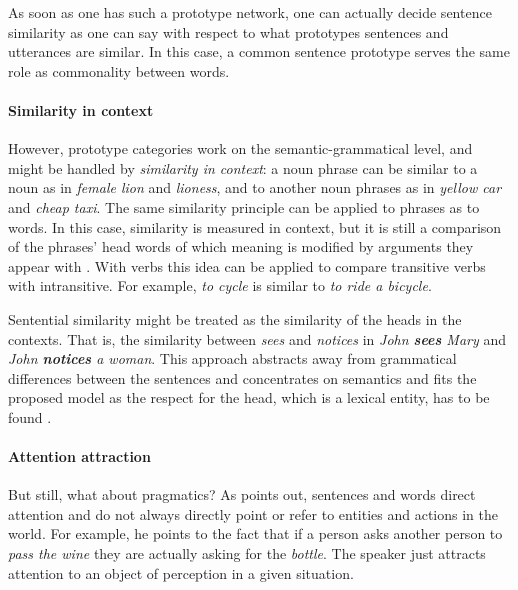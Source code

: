 \documentclass[11pt]{article}
\begin{document}
As soon as one has such a prototype network, one can actually decide sentence similarity as one can say with respect to what prototypes sentences and utterances are similar. In this case, a common sentence prototype serves the same role as commonality between words.

\paragraph{Similarity in context}

However, prototype categories work on the semantic-grammatical level, and might be handled by \emph{similarity in context}: a noun phrase can be similar to a noun as in \textit{female lion} and \textit{lioness}, and to another noun phrases as in \textit{yellow car} and \textit{cheap taxi}. The same similarity principle can be applied to phrases as to words. In this case, similarity is measured in context, but it is still a comparison of the phrases' head words of which meaning is modified by arguments they appear with \cite{Kintsch2001173,mitchell-lapata:2008:ACLMain,mitchell2010composition,Dinu:2010:MDS:1870658.1870771,Baroni2010nouns,thater-furstenau-pinkal:2011:IJCNLP-2011,Seaghdha:2011:PMS:2145432.2145545}. With verbs this idea can be applied to compare transitive verbs with intransitive. For example, \textit{to cycle} is similar to \textit{to ride a bicycle}.

Sentential similarity might be treated as the similarity of the heads in the contexts. That is, the similarity between \textit{sees} and \textit{notices} in \textit{John \textbf{sees} Mary} and \textit{John \textbf{notices} a woman}. This approach abstracts away from grammatical differences between the sentences and concentrates on semantics and fits the proposed model as the respect for the head, which is a lexical entity, has to be found \cite{corbett1993heads}.


\paragraph{Attention attraction}

But still, what about pragmatics? As  points out, sentences and words direct attention and do not always directly point or refer to entities and actions in the world. For example, he points to the fact that if a person asks another person to \textit{pass the wine} they are actually asking for the \textit{bottle}. The speaker just attracts attention to an object of perception in a given situation.
\end{document}
